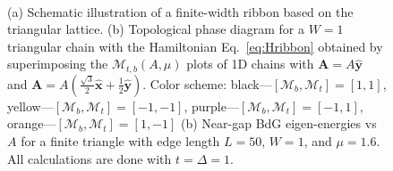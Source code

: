 \documentclass[aps,prb,twocolumn,showpacs,amsmath,amssymb,superscriptaddress]{revtex4-2}
\let\oldhat\hat
\renewcommand{\hat}[1]{\oldhat{\mathbf{#1}}}
\renewcommand{\vec}[1]{\mathbf{#1}}
\begin{document}
\begin{figure}[ht]
  \vspace{-15pt}
  \hspace{30pt}
   \\
  \vspace{-00pt}
  \caption{(a) Schematic illustration of a finite-width ribbon based on the triangular lattice. (b) Topological phase diagram for a $W=1$ triangular chain with the Hamiltonian Eq.~\eqref{eq:Hribbon} obtained by superimposing the $\mathcal{M}_{t,b}(A, \mu)$ plots of 1D chains with $\mathbf A = A\hat{y}$ and $\mathbf A = A(\frac{\sqrt{3}}{2}\hat{x}+\frac{1}{2}\hat{y})$. Color scheme: black---$[\mathcal{M}_b,\mathcal{M}_t]=[1,1]$, yellow---$[\mathcal{M}_b,\mathcal{M}_t]=[-1,-1]$, purple---$[\mathcal{M}_b,\mathcal{M}_t]=[-1,1]$, orange---$[\mathcal{M}_b, \mathcal{M}_t]=[1,-1]$ (b) Near-gap BdG eigen-energies vs $A$ for a finite triangle with edge length $L = 50$, $W=1$, and $\mu=1.6$. All calculations are done with $t=\Delta =1$.}
  \label{fig: pd}
\end{figure}
\end{document}
